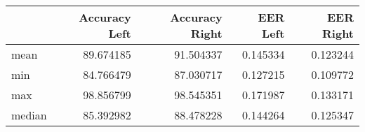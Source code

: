 \begin{tabular}{lrrrr}
\toprule
{} &  Accuracy Left &  Accuracy Right &  EER Left &  EER Right \\
\midrule
mean   &      89.674185 &       91.504337 &  0.145334 &   0.123244 \\
min    &      84.766479 &       87.030717 &  0.127215 &   0.109772 \\
max    &      98.856799 &       98.545351 &  0.171987 &   0.133171 \\
median &      85.392982 &       88.478228 &  0.144264 &   0.125347 \\
\bottomrule
\end{tabular}
